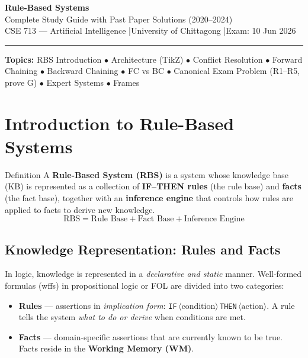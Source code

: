 \documentclass[12pt,a4paper]{article}
\begin{document}
\begin{center}
{\Huge\bfseries\color{ruleblue}Rule-Based Systems}\\[0.4cm]
{\large Complete Study Guide with Past Paper Solutions (2020--2024)}\\[0.2cm]
{\normalsize CSE 713 --- Artificial Intelligence \quad|\quad University of Chittagong \quad|\quad Exam: 10 Jun 2026}\\[0.2cm]
\rule{14cm}{0.5pt}
\end{center}

\begin{tcolorbox}[colback=lightblue,colframe=ruleblue]
\textbf{Topics:} RBS Introduction $\bullet$ Architecture (TikZ) $\bullet$ Conflict Resolution $\bullet$
Forward Chaining $\bullet$ Backward Chaining $\bullet$ FC vs BC $\bullet$
Canonical Exam Problem (R1--R5, prove G) $\bullet$ Expert Systems $\bullet$ Frames
\end{tcolorbox}

\tableofcontents\newpage

\section{Introduction to Rule-Based Systems}

\begin{defbox}{Definition}
A \textbf{Rule-Based System (RBS)} is a system whose knowledge base (KB) is represented as a
collection of \textbf{IF--THEN rules} (the rule base) and \textbf{facts} (the fact base), together with
an \textbf{inference engine} that controls how rules are applied to facts to derive new knowledge.
\[
\text{RBS} = \text{Rule Base} + \text{Fact Base} + \text{Inference Engine}
\]
\end{defbox}

\subsection{Knowledge Representation: Rules and Facts}

In logic, knowledge is represented in a \textit{declarative and static} manner.
Well-formed formulas (wffs) in propositional logic or FOL are divided into two categories:

\begin{itemize}[itemsep=4pt]
  \item \textbf{Rules} --- assertions in \textit{implication form}:
        \texttt{IF}\,\(\langle\text{condition}\rangle\)\,\texttt{THEN}\,\(\langle\text{action}\rangle\).
        A rule tells the system \emph{what to do or derive} when conditions are met.
  \item \textbf{Facts} --- domain-specific assertions that are currently known to be true.
        Facts reside in the \textbf{Working Memory (WM)}.
\end{itemize}
\end{document}
